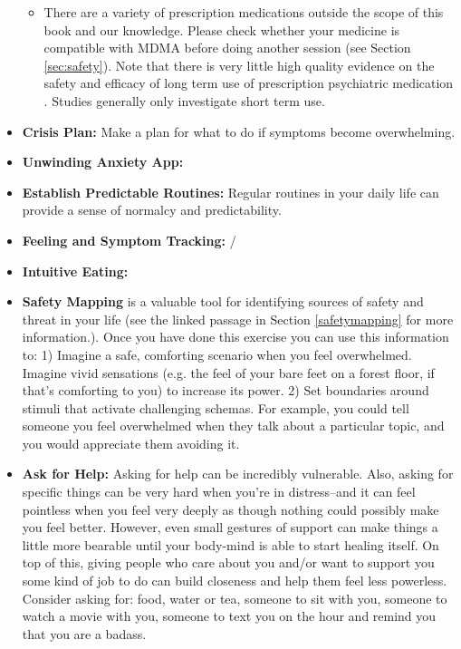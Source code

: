 \documentclass[12pt,letterpaper]{book}
\begin{document}
\begin{itemize}
\begin{itemize}
        \item There are a variety of prescription medications outside the scope of this book and our knowledge. Please check whether your medicine is compatible with MDMA before doing another session (see Section \ref{sec:safety}). Note that there is very little high quality evidence on the safety and efficacy of long term use of prescription psychiatric medication \cite{leuchtDecline}. Studies generally only investigate short term use.
    \end{itemize}
    \item \textbf{Crisis Plan:} Make a plan for what to do if symptoms become overwhelming. 
    \item \textbf{Unwinding Anxiety App:} 
    \item \textbf{Establish Predictable Routines:} Regular routines in your daily life can provide a sense of normalcy and predictability. 
    \item \textbf{Feeling and Symptom Tracking:} /
    \item \textbf{Intuitive Eating:} 
    \item \textbf{Safety Mapping} is a valuable tool for identifying sources of safety and threat in your life (see the linked passage in Section \ref{safetymapping} for more information.). Once you have done this exercise you can use this information to: 1) Imagine a safe, comforting scenario when you feel overwhelmed. Imagine vivid sensations (e.g. the feel of your bare feet on a forest floor, if that's comforting to you) to increase its power. 2) Set boundaries around stimuli that activate challenging schemas. For example, you could tell someone you feel overwhelmed when they talk about a particular topic, and you would appreciate them avoiding it.
    \item \textbf{Ask for Help:} Asking for help can be incredibly vulnerable. Also, asking for specific things can be very hard when you're in distress–and it can feel pointless when you feel very deeply as though nothing could possibly make you feel better. However, even small gestures of support can make things a little more bearable until your body-mind is able to start healing itself. On top of this, giving people who care about you and/or want to support you some kind of job to do can build closeness and help them feel less powerless. Consider asking for: food, water or tea, someone to sit with you, someone to watch a movie with you, someone to text you on the hour and remind you that you are a badass.

\end{itemize}
\end{document}
